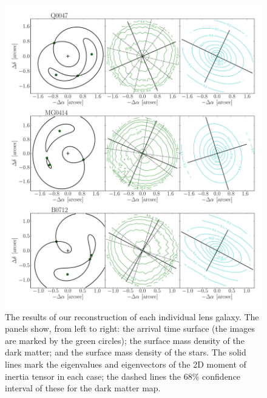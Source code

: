 \documentclass[useAMS,usenatbib]{mn2e}
\begin{document}
\begin{figure}
  \centering
  \includegraphics[width=.83\linewidth]{Figures/AllLenses31.pdf}
  \caption[width=.65\linewidth]{The results of our reconstruction of each individual lens galaxy. The panels show, from left to right: the arrival time surface (the images are marked by the green circles); the surface mass density of the dark matter; and the surface mass density of the stars. The solid lines mark the eigenvalues and eigenvectors of the 2D moment of inertia tensor in each case; the dashed lines the 68\% confidence interval of these for the dark matter map.}
  \label{fig:lensreconstruction1}
\end{figure}
\end{document}
